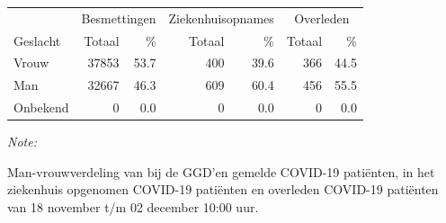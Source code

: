 \documentclass[
  english,
  man,floatsintext]{apa6}
\begin{document}
\begin{table}[H]
\centering\begingroup\fontsize{11}{13}\selectfont

\begin{threeparttable}
\begin{tabular}{lrrrrrr}
\toprule
\multicolumn{1}{c}{ } & \multicolumn{2}{c}{Besmettingen} & \multicolumn{2}{c}{Ziekenhuisopnames} & \multicolumn{2}{c}{Overleden} \\
\cmidrule(l{3pt}r{3pt}){2-3} \cmidrule(l{3pt}r{3pt}){4-5} \cmidrule(l{3pt}r{3pt}){6-7}
Geslacht & Totaal & \% & Totaal & \% & Totaal & \%\\
\midrule
Vrouw & 37853 & 53.7 & 400 & 39.6 & 366 & 44.5\\
Man & 32667 & 46.3 & 609 & 60.4 & 456 & 55.5\\
Onbekend & 0 & 0.0 & 0 & 0.0 & 0 & 0.0\\
\bottomrule
\end{tabular}
\begin{tablenotes}
\item \textit{Note: } 
\item Man-vrouwverdeling van bij de GGD’en gemelde COVID-19 patiënten, in het ziekenhuis opgenomen COVID-19 patiënten en overleden COVID-19 patiënten van 18 november t/m 02 december 10:00 uur.
\end{tablenotes}
\end{threeparttable}
\endgroup{}
\end{table}
\newpage
\end{document}
